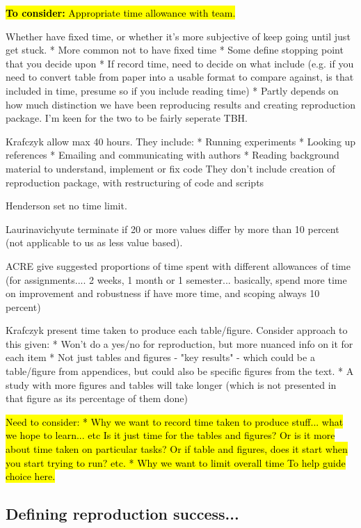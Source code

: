 \hl{\textbf{To consider:} Appropriate time allowance with team.}

Whether have fixed time, or whether it's more subjective of keep going until just get stuck.
* More common not to have fixed time
* Some define stopping point that you decide upon
* If record time, need to decide on what include (e.g. if you need to convert table from paper into a usable format to compare against, is that included in time, presume so if you include reading time)
* Partly depends on how much distinction we have been reproducing results and creating reproduction package. I'm keen for the two to be fairly seperate TBH.

Krafczyk allow max 40 hours. They include:
* Running experiments
* Looking up references
* Emailing and communicating with authors
* Reading background material to understand, implement or fix code
They don't include creation of reproduction package, with restructuring of code and scripts\autocite{krafczyk_learning_2021}

Henderson set no time limit.\autocite{henderson_reproducibility_2024}

Laurinavichyute terminate if 20 or more values differ by more than 10 percent (not applicable to us as less value based).\autocite{laurinavichyute_share_2022}

ACRE give suggested proportions of time spent with different allowances of time (for assignments.... 2 weeks, 1 month or 1 semester... basically, spend more time on improvement and robustness if have more time, and scoping always 10 percent)

Krafczyk present time taken to produce each table/figure. Consider approach to this given:
* Won't do a yes/no for reproduction, but more nuanced info on it for each item
* Not just tables and figures - "key results" - which could be a table/figure from appendices, but could also be specific figures from the text.
* A study with more figures and tables will take longer (which is not presented in that figure as its percentage of them done)

\hl{Need to consider:
* Why we want to record time taken to produce stuff... what we hope to learn... etc Is it just time for the tables and figures? Or is it more about time taken on particular tasks? Or if table and figures, does it start when you start trying to run? etc.
* Why we want to limit overall time
To help guide choice here.}

\subsection{Defining reproduction success...}

